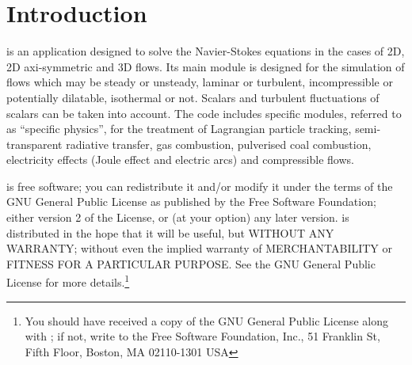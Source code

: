 
%
%
%
%


\nopagebreak
\section{Introduction}

\CS is an application designed to solve the Navier-Stokes
equations in the cases of 2D, 2D axi-symmetric and 3D flows. Its main module is
designed for the simulation of flows which may be steady or
unsteady, laminar or turbulent, incompressible or potentially dilatable,
isothermal or not. Scalars and turbulent fluctuations of scalars can be taken into
account. The code includes specific modules, referred to as ``specific physics'',
for the treatment of Lagrangian particle tracking, semi-transparent radiative transfer,
gas combustion, pulverised coal combustion,
electricity effects (Joule effect and electric arcs) and compressible flows.

\CS is free software; you can redistribute it
and/or modify it under the terms of the GNU General Public License
as published by the Free Software Foundation; either version 2 of
the License, or (at your option) any later version.
\CS is distributed in the hope that it will be
useful, but WITHOUT ANY WARRANTY; without even the implied warranty
of MERCHANTABILITY or FITNESS FOR A PARTICULAR PURPOSE.  See the
GNU General Public License for more details.\footnote{You should have
received a copy of the GNU General Public License
along with \CS; if not, write to the
Free Software Foundation, Inc.,
51 Franklin St, Fifth Floor,
Boston, MA  02110-1301  USA}


